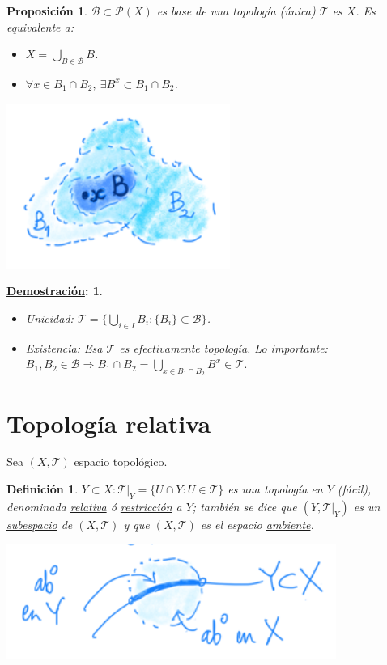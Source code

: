 \documentclass[10pt,a4paper,openright]{book}
\theoremstyle{break}
\newtheorem*{defi}{Definición}
\newtheorem*{prop}{Proposición}
\newtheorem*{demo}{\underline{Demostración}:}
\begin{document}
\begin{prop}
$\mathcal{B} \subset \mathcal{P} \left( X \right)$ es base de una topología (única) $\mathcal{T}$ es $X$. Es equivalente a: 
\begin{itemize}
    \item $X = \bigcup_{B \in \mathcal{B}} B$.
    \item $\forall x \in B_1 \cap B_2,\ \exists B^x \subset B_1 \cap B_2$.
\end{itemize}
\begin{center}
    \includegraphics[scale=0.3]{images/base_unica} 
\end{center}
\end{prop}
\begin{demo}
\begin{itemize}
    \item \underline{Unicidad}: $\mathcal{T} = \{\bigcup_{i \in  I} B_i: \{B_i\} \subset \mathcal{B}\}$.
    \item \underline{Existencia}: Esa $\mathcal{T}$ es efectivamente topología. Lo importante: $B_1, B_2 \in \mathcal{B} \Rightarrow B_1 \cap B_2 = \bigcup_{x \in B_1 \cap B_2} B^x \in \mathcal{T}$.
\end{itemize}
\end{demo}

\section{Topología relativa}%
\label{sec:topologia_relativa}
Sea $\left( X, \mathcal{T} \right)$ espacio topológico.
\begin{defi}
$Y \subset X: \mathcal{T}|_Y = \{U \cap Y: U \in \mathcal{T}\}$ es una topología en $Y$ (fácil), denominada \underline{relativa} ó \underline{restricción} a $Y$; también se dice que $\left( Y, \mathcal{T}|_Y \right)$ es un \underline{subespacio} de $\left( X, \mathcal{T} \right)$ y que $\left( X, \mathcal{T} \right)$ es el espacio \underline{ambiente}. 
\begin{center}
    \includegraphics[scale=0.3]{images/def_subespacio_top} 
\end{center}
\end{defi}
\end{document}
